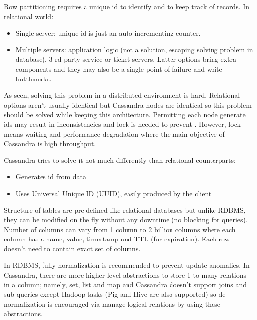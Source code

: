 Row partitioning requires a unique id to identify and to keep track of records. In relational world:
\begin{itemize}
  \item Single server: unique id is just an auto incrementing counter.
  \item Multiple servers: application logic (not a solution, escaping solving problem in database), 3-rd party service or ticket servers. Latter options bring extra components and they may also be a single point of failure and write bottlenecks.
\end{itemize}

As seen, solving this problem in a distributed environment is hard. Relational options aren't usually identical but Cassandra nodes are identical so this problem should be solved while keeping this architecture. Permitting each node generate ids may result in inconsistencies and lock is needed to prevent . However, lock means waiting and performance degradation where the main objective of Cassandra is high throughput.

Cassandra tries to solve it not much differently than relational counterparts:
\begin{itemize}
  \item Generates id from data
  \item Uses Universal Unique ID (UUID), easily produced by the client
\end{itemize}

Structure of tables are pre-defined like relational databases but unlike RDBMS, they can be modified on the fly without any downtime (no blocking for queries). Number of columns can vary from 1 column to 2 billion columns where each column has a name, value, timestamp and TTL (for expiration). Each row doesn't need to contain exact set of columns.

In RDBMS, fully normalization is recommended to prevent update anomalies. In Cassandra, there are more higher level abstractions to store 1 to many relations in a column; namely, set, list and map and Cassandra doesn't support joins and sub-queries except Hadoop tasks (Pig and Hive are also supported) so de-normalization is encouraged via manage logical relations by using these abstractions.

